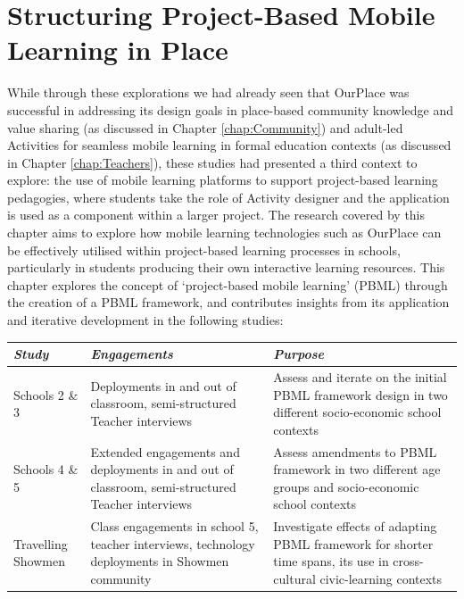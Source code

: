 \chapter{Structuring Project-Based Mobile Learning in Place}
\label{chap:student-created}

While through these explorations we had already seen that OurPlace was successful in addressing its design goals in place-based community knowledge and value sharing (as discussed in Chapter \ref{chap:Community}) and adult-led Activities for seamless mobile learning in formal education contexts (as discussed in Chapter \ref{chap:Teachers}), these studies had presented a third context to explore: the use of mobile learning platforms to support project-based learning pedagogies, where students take the role of Activity designer and the application is used as a component within a larger project. The research covered by this chapter aims to explore how mobile learning technologies such as OurPlace can be effectively utilised within project-based learning processes in schools, particularly in students producing their own interactive learning resources. This chapter explores the concept of `project-based mobile learning' (PBML) through the creation of a PBML framework, and contributes insights from its application and iterative development in the following studies:

{\raggedright
\begin{tabularx}{\textwidth}{| p{35mm} | p{50mm} | X |}
\hline
    {\small\textit{\textbf{Study}}}
    & {\small\textit{\textbf{Engagements}}} 
    & {\small\textit{\textbf{Purpose}}} \\
    \hline
    {\footnotesize Schools 2 \& 3 }
    & {\footnotesize Deployments in and out of classroom, semi-structured Teacher interviews} 
    & {\footnotesize Assess and iterate on the initial PBML framework design in two different socio-economic school contexts} \\
    \hline
    {\footnotesize Schools 4 \& 5 }
    & {\footnotesize Extended engagements and deployments in and out of classroom, semi-structured Teacher interviews} 
    & {\footnotesize Assess amendments to PBML framework in two different age groups and socio-economic school contexts}  \\
    \hline
    {\footnotesize Travelling Showmen }
    & {\footnotesize Class engagements in school 5, teacher interviews, technology deployments in Showmen community} 
    & {\footnotesize Investigate effects of adapting PBML framework for shorter time spans, its use in cross-cultural civic-learning contexts}  \\
    \hline
\end{tabularx}
}

